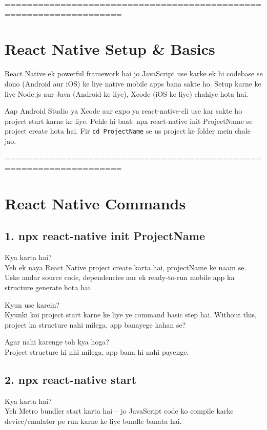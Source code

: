 \documentclass[a4paper]{article}
\newcommand\imp[1]{{\color{ImportantRed}#1}}
\begin{document}
===================================================================
\section*{React Native Setup \& Basics}
\rmfamily

React Native ek powerful framework hai jo JavaScript use karke ek hi codebase se dono (Android aur iOS) ke liye native mobile apps bana sakte ho. Setup karne ke liye \imp{Node.js} aur \imp{Java} (Android ke liye), \imp{Xcode} (iOS ke liye) chahiye hota hai.

Aap \imp{Android Studio} ya \imp{Xcode} aur \imp{expo} ya \imp{react-native-cli} use kar sakte ho project start karne ke liye.  
Pehle hi baat: \imp{npx react-native init ProjectName} se project create hota hai. Fir \texttt{cd ProjectName} se us project ke folder mein chale jao.

===================================================================
\section*{React Native Commands}
\subsection*{1. npx react-native init ProjectName}
\imp{Kya karta hai?}\\
Yeh ek naya React Native project create karta hai, projectName ke naam se. Uske andar source code, dependencies aur ek ready-to-run mobile app ka structure generate hota hai.

\imp{Kyun use karein?}\\
Kyunki koi project start karne ke liye ye command basic step hai. Without this, project ka structure nahi milega, app banayege kahan se?

\imp{Agar nahi karenge toh kya hoga?}\\
Project structure hi nhi milega, app bana hi nahi payenge.

\vspace{0.9em}
\subsection*{2. npx react-native start}
\imp{Kya karta hai?}\\
Yeh Metro bundler start karta hai – jo JavaScript code ko compile karke device/emulator pe run karne ke liye bundle banata hai.
\end{document}

